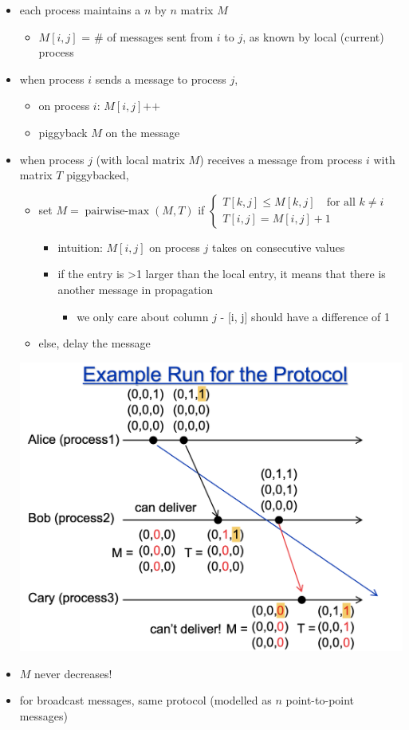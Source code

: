 \documentclass[10pt, landscape]{article}
\DeclareMathOperator{\pairwisemax}{pairwise-max}
\begin{document}
\begin{multicols*}{3}
  \begin{itemize}
    \item each process maintains a $n$ by $n$ matrix $M$
      \begin{itemize}
        \item $M[i, j]$ = \# of messages sent from $i$ to $j$, as known by local (current) process
      \end{itemize}
    \item when process $i$ sends a message to process $j$,
      \begin{itemize}
        \item on process $i$:  $M[i, j]\texttt{++}$
        \item piggyback $M$ on the message
      \end{itemize}
    \item when process $j$ (with local matrix $M$) receives a message from process $i$ with matrix $T$ piggybacked,
      \begin{itemize}
        \item set $M = \pairwisemax(M, T)$ if $\begin{cases} T[k, j]\leq M[k, j] \quad \text{for all }k\neq i\\ T[i, j] = M[i, j] + 1 \end{cases}$
          \begin{itemize}
            \item intuition: $M[i, j]$ on process $j$ takes on consecutive values
            \item if the entry is >1 larger than the local entry, it means that there is another message in propagation
              \begin{itemize}
                \item we only care about column $j$ - [i, j] should have a difference of 1
              \end{itemize}
          \end{itemize}
        \item else, delay the message
      \end{itemize}
      \begin{tightcenter}
        \includegraphics[width=0.7\linewidth]{cs4231-causal-ordering-protocol-example.png} 
      \end{tightcenter}
    \item $M$ never decreases!
    \item for broadcast messages, same protocol (modelled as $n$ point-to-point messages)
  \end{itemize}


\end{multicols*}
\end{document}
